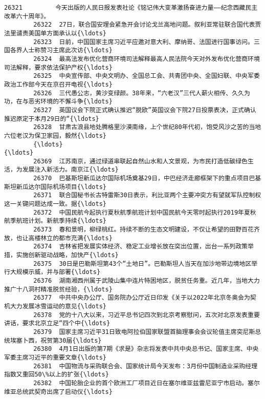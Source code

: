 \documentclass[11pt]{article}
\begin{document}
\begin{Verbatim}[commandchars=\\\{\}]
        26321         今天出版的人民日报发表社论《铭记伟大变革激扬奋进力量——纪念西藏民主改革六十周年》。  
        26322  27日，联合国安理会紧急开会讨论戈兰高地问题。叙利亚常驻联合国代表贾法里谴责美国单方面承认以{\ldots}  
        26323  日前，中国国家主席习近平应邀对意大利、摩纳哥、法国进行国事访问。三国各界人士称赞习主席此次访{\ldots}  
        26324  最高法发布优化营商环境司法解释最高人民法院今天对外发布优化营商环境司法解释，要求依法保护产权{\ldots}  
        26325  中央宣传部、中央文明办、全国总工会、共青团中央、全国妇联、中央军委政治工作部今天在京召开电视{\ldots}  
        26326  三代愚公志，黄沙变绿颜。38年来，“六老汉”三代人薪火相传、久久为功，在与恶劣环境的不懈斗争{\ldots}  
        26327  英国议会下院正式确认推迟“脱欧”英国议会下院27日投票表决，正式确认推迟原定于本月29日的“{\ldots}  
        26328  甘肃古浪县地处腾格里沙漠南缘，上个世纪80年代初，饱受风沙之苦的当地六位老汉为保卫家园，毅然{\ldots}  
        {\ldots}                                                  {\ldots}  
        26369  江苏南京，通过绿道串联起自然山水和人文景观，为市民打造低碳绿色生活，为发展注入新活力。南京江{\ldots}  
        26370  巴基斯坦新瓜达尔国际机场奠基29日，中巴经济走廊框架下的重点项目巴基斯坦新瓜达尔国际机场项目{\ldots}  
        26371  联合国秘书长古特雷斯30日表示，利比亚两个主要冲突方有望就军队控制权这一关键问题达成一致。据{\ldots}  
        26372  中国民航今起执行夏秋航季航班计划中国民航今天零时起执行2019年夏秋航季航班计划。新航季持续{\ldots}  
        26373  春和景明，柳绿桃红。持续不断的生态文明建设，不仅让希望的田野百花齐放，也让高楼林立的都市充满{\ldots}  
        26374  吉林省把发展实体经济、稳定工业增长放在突出位置，出台一系列政策举措，实施创新驱动战略，加快产{\ldots}  
        26375  30日是巴勒斯坦第43个“土地日”。巴勒斯坦人当天在加沙地带边境地区举行大规模示威，并与部署{\ldots}  
        26376  湖南湘西州属于武陵山集中连片特困地区，脱贫任务重。近几年，当地大力推广十八洞村精准脱贫经验，{\ldots}  
        26377  中共中央办公厅、国务院办公厅近日印发《关于以2022年北京冬奥会为契机大力发展冰雪运动的意见{\ldots}  
        26378  党的十八大以来，习近平总书记四次到北京考察慰问，五次对北京发表重要讲话，要求北京立足“四个中{\ldots}  
        26379  国家主席习近平31日致电阿拉伯国家联盟首脑理事会会议轮值主席突尼斯总统埃塞卜西，祝贺第30届{\ldots}  
        26380  4月1日出版的第7期《求是》杂志将发表中共中央总书记、国家主席、中央军委主席习近平的重要文章{\ldots}  
        26381  中国物流与采购联合会、国家统计局今天发布：3月份中国制造业采购经理指数又重回50\%以上的扩张{\ldots}  
        26382  中国轮胎企业的首个欧洲工厂项目近日在塞尔维亚兹雷尼亚宁市启动。塞尔维亚总统武契奇出席了启动仪{\ldots}  

\end{Verbatim}
\end{document}
